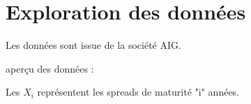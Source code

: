 \section*{Exploration des données}


Les données sont issue de la société AIG. 

aperçu des données :


Les $X_i$ représentent les spreads de maturité "i" années.

